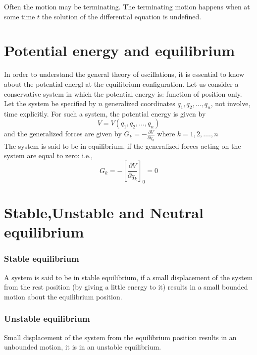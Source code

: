 Often the motion may be terminating. The terminating motion happens when at some time $t$ the solution of the differential equation is undefined.




\section{Potential energy and equilibrium}
In order to understand the general theory of oscillations, it is essential to know about the potential energl at the equilibrium configuration. Let us consider a conservative system in which the potential energy is: function of position only. Let the system be specified by $n$ generalized coordinates $q_{1}, q_{2}, \ldots, q_{n}$, not involve, time explicitly. For such a system, the potential energy is given by
$$
V=V\left(q_{1}, q_{2}, \ldots, q_{n}\right)
$$
and the generalized forces are given by
$G_{k}=-\frac{\partial V}{\partial q_{k}}$ where $k=1,2, \ldots ., n$\\
The system is said to be in equilibrium, if the generalized forces acting on the system are equal to zero: i.e.,
$$
G_{k}=-\left[\frac{\partial V}{\partial q_{k}}\right]_{0}=0
$$


\section{Stable,Unstable and Neutral equilibrium}
\subsubsection{Stable equilibrium}
A system is said to be in stable equilibrium, if a small displacement of the system from the rest position (by giving a little energy to it) results in a small bounded motion about the equilibrium position.
\subsubsection{Unstable equilibrium}
Small displacement of the system from the equilibrium position results in an unbounded motion, it is in an unstable equilibrium.
